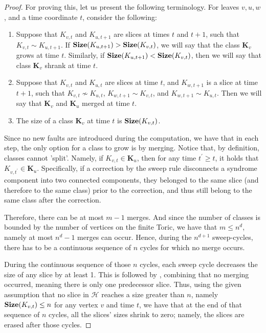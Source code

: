 \begin{proof}
  For proving this, let us present the following terminology. For leaves $v,u,w$, and a time coordinate $t$, consider the following: 
  \begin{enumerate}
    \item Suppose that $K_{v,t}$ and $K_{u,t+1}$ are slices at times $t$ and $t+1$, such that $K_{v,t}\sim K_{u,t+1}$. If $\mathbf{Size}(K_{u,t+1}) > \mathbf{Size}(K_{v,t})$, we will say that the class $\mathbf{K}_{v}$ grows at time $t$. Similarly, if $\mathbf{Size}(K_{u,t+1}) < \mathbf{Size}(K_{v,t})$, then we will say that class $\mathbf{K}_{v}$ shrank at time $t$.
    \item Suppose that $K_{v,t}$ and $K_{u,t}$ are slices at time $t$, and $K_{w,t+1}$ is a slice at time $t+1$, such that $K_{v,t}\not\sim K_{u,t}$, $K_{w,t+1}\sim K_{v,t}$, and $K_{w,t+1}\sim K_{u,t}$. Then we will say that $\textbf{K}_{v}$ and $\textbf{K}_{u}$ merged at time $t$.
    \item The size of a class $\mathbf{K}_{v}$ at time $t$ is $\mathbf{Size}(K_{v,t})$.
  \end{enumerate}
  Since no new faults are introduced during the computation, we have that in each step, the only option for a class to grow is by merging. Notice that, by definition, classes cannot 'split'. Namely, if $K_{v,t}\in \mathbf{K}_{u}$, then for any time $t^{\prime} \ge t$, it holds that $K_{v,t^{\prime}} \in \textbf{K}_{u}$.
Specifically, if a correction by the sweep rule disconnects a syndrome component into two connected components, they belonged to the same slice (and therefore to the same class) prior to the correction, and thus still belong to the same class after the correction.

Therefore, there can be at most $m-1$ merges. And since the number of classes is bounded by the number of vertices on the finite Toric, we have that $m \le n^{d}$, namely at most $n^{d}-1$ merges can occur. Hence, during the $n^{d+1}$ sweep-cycles, there has to be a continuous sequence of $n$ cycles for which no merge occurs. 



During the continuous sequence of those $n$ cycles, each sweep cycle decreases the size of any slice by at least 1. This is followed by , combining that no merging occurred, meaning there is only one predecessor slice. Thus, using the given assumption that no slice in $\mathcal{H}$ reaches a size greater than $n$, namely $\mathbf{Size}(K_{v,t}) \le n$ for any vertex $v$ and time $t$, we have that at the end of that sequence of $n$ cycles, all the slices' sizes shrink to zero; namely, the slices are erased after those cycles.
\end{proof}




